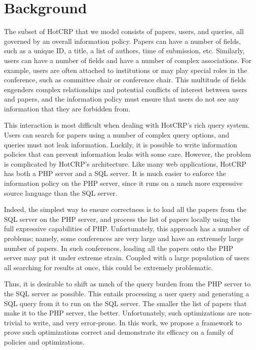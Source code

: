 \documentclass[11pt,journal]{IEEEtran}
\begin{document}
\section{Background}
\label{sec:background}
The subset of HotCRP that we model consists of papers, users, and queries, all governed by an overall information policy.  Papers can have a number of fields, such as a unique ID, a title, a list of authors, time of submission, etc.  Similarly, users can have a number of fields and have a number of complex associations.  For example, users are often attached to institutions or may play special roles in the conference, such as committee chair or conference chair.  This multitude of fields engenders complex relationships and potential conflicts of interest between users and papers, and the information policy must ensure that users do not see any information that they are forbidden from.

This interaction is most difficult when dealing with HotCRP's rich query system.  Users can search for papers using a number of complex query options, and queries must not leak information.  Luckily, it is possible to write information policies that can prevent information leaks with some care\cite{hotcrppaper}.  However, the problem is complicated by HotCRP's architecture.  Like many web applications, HotCRP has both a PHP server and a SQL server.  It is much easier to enforce the information policy on the PHP server, since it runs on a much more expressive source language than the SQL server.

Indeed, the simplest way to ensure correctness is to load all the papers from the SQL server on the PHP server, and process the list of papers locally using the full expressive capabilities of PHP.  Unfortunately, this approach has a number of problems; namely, some conferences are very large and have an extremely large number of papers.  In such conferences, loading all the papers onto the PHP server may put it under extreme strain.  Coupled with a large population of users all searching for results at once, this could be extremely problematic.

Thus, it is desirable to shift as much of the query burden from the PHP server to the SQL server as possible.  This entails processing a user query and generating a SQL query from it to run on the SQL server.  The smaller the list of papers that make it to the PHP server, the better.  Unfortunately, such optimizations are non-trivial to write, and very error-prone.  In this work, we propose a framework to prove such optimizations correct and demonstrate its efficacy on a family of policies and optimizations.
\end{document}

